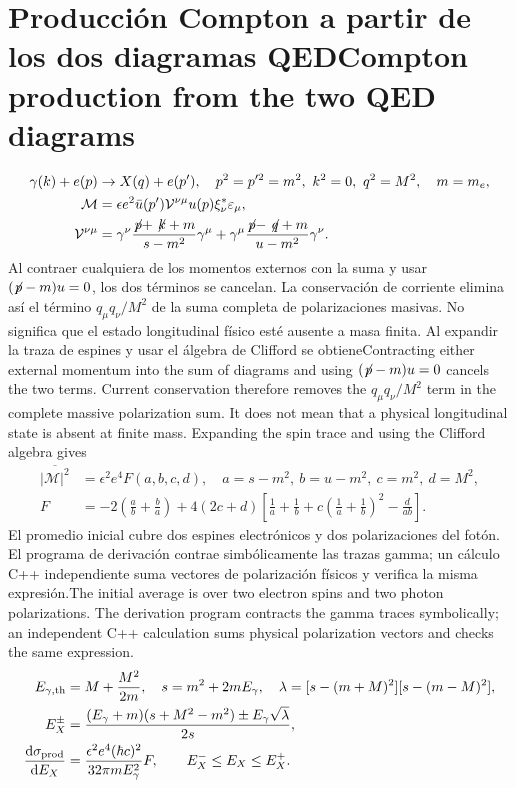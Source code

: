 \documentclass[11pt]{article}
\newcommand{\B}[2]{\ifspanish#2\else#1\fi}
\newcommand{\dd}{\mathrm d}\newcommand{\slsh}[1]{\not\!#1}
\begin{document}
\section{\B{Compton production from the two QED diagrams}{Producción Compton a partir de los dos diagramas QED}}
\begin{align}
\gamma(k)+e(p)&\to X(q)+e(p'),\quad p^2=p'^2=m^2,\ k^2=0,\ q^2=M^2,\quad m=m_e,\\
\mathcal M&=\epsilon e^2\bar u(p')\mathcal V^{\nu\mu}u(p)\xi^*_{\nu}\varepsilon_\mu,\\
\mathcal V^{\nu\mu}&=\gamma^\nu\frac{\slsh p+\slsh k+m}{s-m^2}\gamma^\mu+
 \gamma^\mu\frac{\slsh p-\slsh q+m}{u-m^2}\gamma^\nu.
\end{align}
\B{Contracting either external momentum into the sum of diagrams and using $(\slsh p-m)u=0$ cancels the two terms. Current conservation therefore removes the $q_\mu q_\nu/M^2$ term in the complete massive polarization sum. It does not mean that a physical longitudinal state is absent at finite mass. Expanding the spin trace and using the Clifford algebra gives}
{Al contraer cualquiera de los momentos externos con la suma y usar $(\slsh p-m)u=0$, los dos términos se cancelan. La conservación de corriente elimina así el término $q_\mu q_\nu/M^2$ de la suma completa de polarizaciones masivas. No significa que el estado longitudinal físico esté ausente a masa finita. Al expandir la traza de espines y usar el álgebra de Clifford se obtiene}
\begin{align}
\overline{|\mathcal M|^2}&=\epsilon^2e^4 F(a,b,c,d),\quad a=s-m^2,\ b=u-m^2,\ c=m^2,\ d=M^2,\\
F&=-2\left(\frac ab+\frac ba\right)+4(2c+d)
 \left[\frac1a+\frac1b+c\left(\frac1a+\frac1b\right)^2-\frac d{ab}\right].
\end{align}
\B{The initial average is over two electron spins and two photon polarizations. The derivation program contracts the gamma traces symbolically; an independent C++ calculation sums physical polarization vectors and checks the same expression.}
{El promedio inicial cubre dos espines electrónicos y dos polarizaciones del fotón. El programa de derivación contrae simbólicamente las trazas gamma; un cálculo C++ independiente suma vectores de polarización físicos y verifica la misma expresión.}
\begin{align}
 E_{\gamma,\rm th}&=M+\frac{M^2}{2m},\quad s=m^2+2mE_\gamma,\quad
 \lambda=[s-(m+M)^2][s-(m-M)^2],\\
 E_X^\pm&=\frac{(E_\gamma+m)(s+M^2-m^2)\pm E_\gamma\sqrt\lambda}{2s},\\
 \frac{\dd\sigma_{\rm prod}}{\dd E_X}&=\frac{\epsilon^2 e^4(\hbar c)^2}{32\pi m E_\gamma^2}F,
 \qquad E_X^-\le E_X\le E_X^+.
\end{align}
\end{document}
